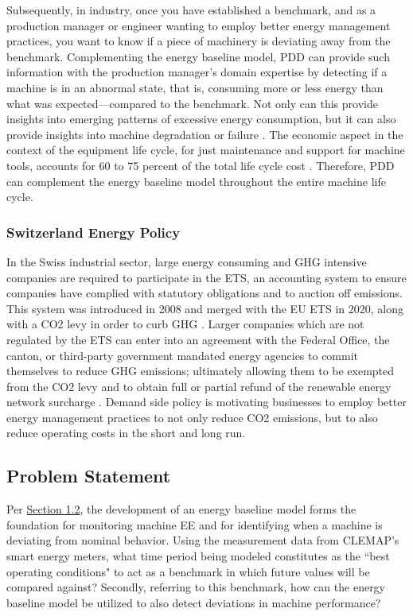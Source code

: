 Subsequently, in industry, once you have established a benchmark, and as a production manager or engineer wanting to employ better energy management practices, you want to know if a piece of machinery is deviating away from the benchmark. Complementing the energy baseline model, \ac{PDD} can provide such information with the production manager's domain expertise by detecting if a machine is in an abnormal state, that is, consuming more or less energy than what was expected—compared to the benchmark. Not only can this provide insights into emerging patterns of excessive energy consumption, but it can also provide insights into machine degradation or failure \cite{online-fault-monitoring}. The economic aspect in the context of the equipment life cycle, for just maintenance and support for machine tools, accounts for 60 to 75 percent of the total life cycle cost \cite{econ-costs}. Therefore, PDD can complement the energy baseline model throughout the entire machine life cycle.

\subsubsection{Switzerland Energy Policy}
In the Swiss industrial sector, large energy consuming and \ac{GHG} intensive companies are required to participate in the \ac{ETS}, an accounting system to ensure companies have complied with statutory obligations and to auction off emissions. This system was introduced in 2008 and merged with the \ac{EU} ETS in 2020, along with a \ac{CO2} levy in order to curb GHG \cite{carbon_trading}. Larger companies which are not regulated by the ETS can enter into an agreement with the Federal Office, the canton, or third-party government mandated energy agencies to commit themselves to reduce GHG emissions; ultimately allowing them to be exempted from the CO2 levy and to obtain full or partial refund of the renewable energy network surcharge \cite{optional}. Demand side policy is motivating businesses to employ better energy management practices to not only reduce CO2 emissions, but to also reduce operating costs in the short and long run. 

\subsection{Problem Statement}

Per \hyperlink{subsection.1.2}{Section 1.2}, the development of an energy baseline model forms the foundation for monitoring machine EE and for identifying when a machine is deviating from nominal behavior. Using the measurement data from CLEMAP's smart energy meters, what time period being modeled constitutes as the ``best operating conditions" to act as a benchmark in which future values will be compared against? Secondly, referring to this benchmark, how can the energy baseline model be utilized to also detect deviations in machine performance?


